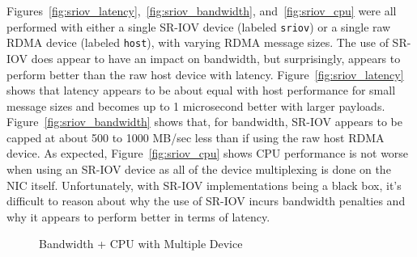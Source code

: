 \documentclass[12pt,titlepage]{article}
\begin{document}
Figures~\ref{fig:sriov_latency},~\ref{fig:sriov_bandwidth}, and~\ref{fig:sriov_cpu} were all performed with either a single SR-IOV device (labeled \texttt{sriov}) or a single raw RDMA device (labeled \texttt{host}), with varying RDMA message sizes.
The use of SR-IOV does appear to have an impact on bandwidth, but surprisingly, appears to perform better than the raw host device with latency.
Figure~\ref{fig:sriov_latency} shows that latency appears to be about equal with host performance for small message sizes and becomes up to 1 microsecond better with larger payloads.
Figure~\ref{fig:sriov_bandwidth} shows that, for bandwidth, SR-IOV appears to be capped at about 500 to 1000 MB/sec less than if using the raw host RDMA device.
As expected, Figure~\ref{fig:sriov_cpu} shows CPU performance is not worse when using an SR-IOV device as all of the device multiplexing is done on the NIC itself. 
Unfortunately, with SR-IOV implementations being a black box, it's difficult to reason about why the use of SR-IOV incurs bandwidth penalties and why it appears to perform better in terms of latency.

\begin{figure}
	\centering
	\caption{Bandwidth + CPU with Multiple Device}%
	\label{fig:sriov_multi_vdev}
\end{figure}
\end{document}
